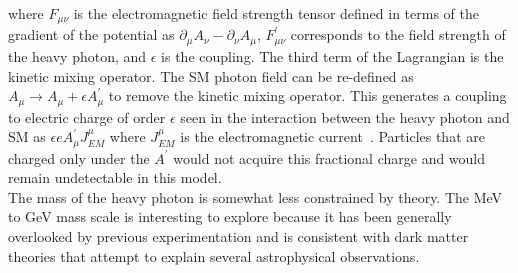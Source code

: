 where $F_{\mu\nu}$ is the electromagnetic field strength tensor defined in terms of the gradient of the potential as $\partial_{\mu}A_{\nu}-\partial_{\nu}A_{\mu}$, $F^{\prime}_{\mu\nu}$ corresponds to the field strength of the heavy photon, and $\epsilon$ is the coupling. The third term of the Lagrangian is the kinetic mixing operator. The SM photon field can be re-defined as $A_{\mu}\rightarrow A_{\mu}+\epsilon A^{\prime}_{\mu}$ to remove the kinetic mixing operator. This generates a coupling to electric charge of order $\epsilon$ seen in the interaction between the heavy photon and SM as $\epsilon e A^{\prime}_{\mu}J^{\mu}_{EM}$ where $J^{\mu}_{EM}$ is the electromagnetic current~\cite{bjorken_new_2009}. Particles that are charged only under the $A^{\prime}$ would not acquire this fractional charge and would remain undetectable in this model. \\
\indent The mass of the heavy photon is somewhat less constrained by theory. The MeV to GeV mass scale is interesting to explore because it has been generally overlooked by previous experimentation and is consistent with dark matter theories that attempt to explain several astrophysical observations. 